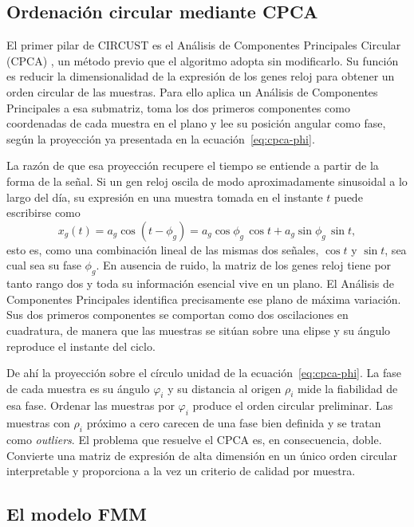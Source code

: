 \documentclass[12pt, a4paper]{report}
\begin{document}
\subsection{Ordenación circular mediante CPCA}
\label{subsec:cpca-formal}

El primer pilar de CIRCUST es el Análisis de Componentes Principales Circular (CPCA) \cite{scholz2007}, un método previo que el algoritmo adopta sin modificarlo. Su función es reducir la dimensionalidad de la expresión de los genes reloj para obtener un orden circular de las muestras. Para ello aplica un Análisis de Componentes Principales a esa submatriz, toma los dos primeros componentes como coordenadas de cada muestra en el plano y lee su posición angular como fase, según la proyección ya presentada en la ecuación~\eqref{eq:cpca-phi}.

La razón de que esa proyección recupere el tiempo se entiende a partir de la forma de la señal. Si un gen reloj oscila de modo aproximadamente sinusoidal a lo largo del día, su expresión en una muestra tomada en el instante $t$ puede escribirse como
\begin{equation}
    x_g(t) = a_g\cos(t-\phi_g) = a_g\cos\phi_g\,\cos t + a_g\sin\phi_g\,\sin t,
    \label{eq:gen-sinusoidal}
\end{equation}
esto es, como una combinación lineal de las mismas dos señales, $\cos t$ y $\sin t$, sea cual sea su fase $\phi_g$. En ausencia de ruido, la matriz de los genes reloj tiene por tanto rango dos y toda su información esencial vive en un plano. El Análisis de Componentes Principales identifica precisamente ese plano de máxima variación. Sus dos primeros componentes se comportan como dos oscilaciones en cuadratura, de manera que las muestras se sitúan sobre una elipse y su ángulo reproduce el instante del ciclo.

De ahí la proyección sobre el círculo unidad de la ecuación~\eqref{eq:cpca-phi}. La fase de cada muestra es su ángulo $\varphi_i$ y su distancia al origen $\rho_i$ mide la fiabilidad de esa fase. Ordenar las muestras por $\varphi_i$ produce el orden circular preliminar. Las muestras con $\rho_i$ próximo a cero carecen de una fase bien definida y se tratan como \textit{outliers}. El problema que resuelve el CPCA es, en consecuencia, doble. Convierte una matriz de expresión de alta dimensión en un único orden circular interpretable y proporciona a la vez un criterio de calidad por muestra.

\subsection{El modelo FMM}
\label{subsec:fmm-formal}
\end{document}
